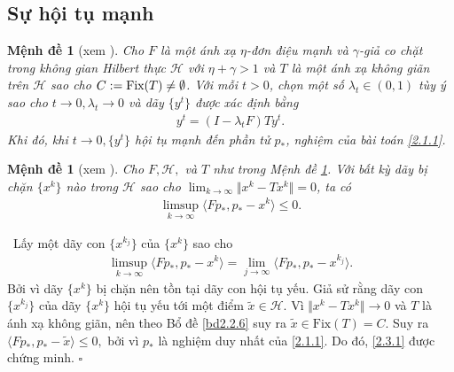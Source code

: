 \documentclass[14pt, oneside,A4paper]{book}
\theoremstyle{plain}
\newcommand{\eproof}{\hfill $\square$}
\newcommand{\chm}{{\bf  Chứng minh.}}
\newtheorem{md}[theorem]{Mệnh đề}
\begin{document}




\subsection{Sự hội tụ mạnh}

\begin{md}[xem \cite{BHN}] \label{mde2.2.7}
	Cho $F$ là một ánh xạ $\eta$-đơn điệu mạnh và $\gamma$-giả co chặt trong không gian Hilbert thực $\mathcal H$ với $\eta + \gamma >1$ và $T$ là một ánh xạ không giãn trên $\mathcal H$ sao cho $C:= \text{\rm Fix}(T) \neq \emptyset$. Với mỗi $t>0$, chọn một số $\lambda_{t} \in (0,1)$ tùy ý sao cho $t \rightarrow 0, \lambda_{t} \rightarrow 0$ và dãy $\lbrace y^{t} \rbrace$ được xác định bằng
	\begin{align} \label{2.2.1}
	y^{t}=(I-\lambda_{t}F)Ty^{t}.
	\end{align}
	Khi đó, khi $t \rightarrow 0, \lbrace y^{t} \rbrace$ hội tụ mạnh đến phần tử $p_{*}$, nghiệm của bài toán \eqref{2.1.1}.
\end{md}

\begin{md}[xem \cite{BHN}] \label{mde2.3.1}
Cho $F,\mathcal H,$ và $T$ như trong Mệnh đề \ref{mde2.2.7}. Với bất kỳ dãy bị chặn $\lbrace x^{k} \rbrace$ nào trong $\mathcal H$ sao cho $\lim_{k \rightarrow \infty} \Vert x^{k}-Tx^{k} \Vert =0$, ta có
\begin{align} \label{2.3.1}
\limsup_{k \rightarrow \infty} \langle Fp_{*},p_{*}-x^{k} \rangle \leq 0.
\end{align}
\end{md}

\noindent \chm \rm \ Lấy một dãy con $\lbrace x^{k_{j}} \rbrace$ của $\lbrace x^{k} \rbrace$ sao cho
\begin{align*}
\limsup_{k \rightarrow \infty} \langle Fp_{*},p_{*}-x^{k} \rangle = \lim_{j \rightarrow \infty} \langle Fp_{*},p_{*}-x^{k_{j}} \rangle.
\end{align*}
Bởi vì dãy $\lbrace x^{k} \rbrace$ bị chặn nên tồn tại dãy con hội tụ yếu. Giả sử rằng dãy con $\lbrace x^{k_{j}} \rbrace$ của dãy $\lbrace x^{k} \rbrace$ hội tụ yếu tới một điểm $\tilde{x} \in \mathcal H$. Vì $\Vert x^{k} - Tx^{k} \Vert \rightarrow 0$ và $T$ là ánh xạ không giãn, nên theo Bổ đề \ref{bd2.2.6} suy ra $\tilde{x} \in \text{Fix}(T)=C$. Suy ra $\langle Fp_{*},p_{*}-\tilde{x} \rangle \leq 0,$ bởi vì $p_{*}$ là nghiệm duy nhất của \eqref{2.1.1}. Do đó, \eqref{2.3.1} được chứng minh.
\eproof
\end{document}
